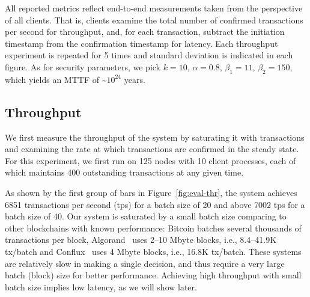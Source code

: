 All reported metrics reflect end-to-end measurements taken from the perspective of all clients.
That is, clients examine the total number of confirmed
transactions per second for throughput, and, for each transaction,
subtract the initiation timestamp
from the confirmation timestamp for latency. Each throughput experiment is
repeated for 5 times and standard deviation is indicated in each figure.
As for security parameters, we pick $k = 10$, $\alpha = 0.8$, $\beta_1 = 11$, $\beta_2 = 150$, which yields an MTTF of \textasciitilde{}$10^{24}$ years.

\subsection{Throughput} %

We first measure the throughput of the system by saturating it with
transactions and examining the rate at which transactions are confirmed in the
steady state.  For this experiment, we first run {\sysname} on 125 nodes
with 10 client processes, each of which maintains 400 outstanding transactions at
any given time.

As shown by the first group of bars in Figure~\ref{fig:eval-thr}, the system achieves
6851 transactions per second (tps) for a batch size of 20 and above 7002 tps for a batch size of 40.
Our system is saturated by a small batch size comparing to other blockchains with known performance:
Bitcoin batches several thousands of transactions per block, Algorand~\cite{GiladHMVZ17} uses 2--10 Mbyte blocks, i.e., 8.4--41.9K tx/batch and Conflux~\cite{confluxLLXLC18} uses 4 Mbyte blocks, i.e., 16.8K tx/batch. These systems are relatively slow in making a single decision, and thus require a very large batch (block) size for better performance. Achieving high throughput with small batch size implies low latency, as we will show later.


